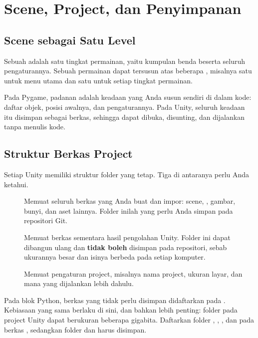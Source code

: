 \section{Scene, Project, dan Penyimpanan}
\label{sec:scene-project}

\subsection{Scene sebagai Satu Level}

Sebuah  adalah satu tingkat permainan, yaitu kumpulan benda
beserta seluruh pengaturannya. Sebuah permainan dapat tersusun atas beberapa
, misalnya satu  untuk menu utama dan satu
 untuk setiap tingkat permainan.

Pada Pygame, padanan  adalah keadaan yang Anda susun sendiri di
dalam kode: daftar objek, posisi awalnya, dan pengaturannya. Pada Unity, seluruh
keadaan itu disimpan sebagai berkas, sehingga dapat dibuka, disunting, dan
dijalankan tanpa menulis kode.

\subsection{Struktur Berkas Project}

Setiap  Unity memiliki struktur folder yang tetap. Tiga di
antaranya perlu Anda ketahui.

\begin{description}
  \item[] Memuat seluruh berkas yang Anda buat dan impor: scene,
        , gambar, bunyi, dan aset lainnya. Folder inilah yang
        perlu Anda simpan pada repositori Git.
  \item[] Memuat berkas sementara hasil pengolahan Unity. Folder
        ini dapat dibangun ulang dan \textbf{tidak boleh} disimpan pada
        repositori, sebab ukurannya besar dan isinya berbeda pada setiap
        komputer.
  \item[] Memuat pengaturan project, misalnya nama
        project, ukuran layar, dan  mana yang dijalankan lebih
        dahulu.
\end{description}

\begin{peringatanbox}
Pada blok Python, berkas yang tidak perlu disimpan didaftarkan pada
. Kebiasaan yang sama berlaku di sini, dan bahkan lebih
penting: folder  pada project Unity dapat berukuran beberapa
gigabita. Daftarkan folder , , , dan
 pada berkas , sedangkan folder  dan
 harus disimpan.
\end{peringatanbox}

